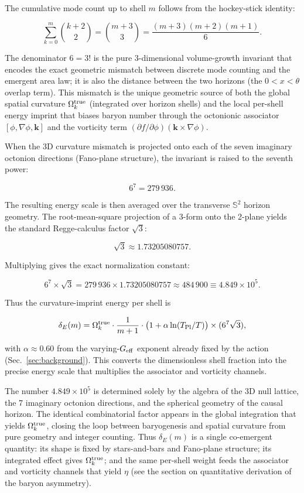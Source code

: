 \documentclass[12pt,a4paper]{article}
\begin{document}
The cumulative mode count up to shell \(m\) follows from the hockey-stick identity:

\[
\sum_{k=0}^m \binom{k+2}{2} = \binom{m+3}{3} = \frac{(m+3)(m+2)(m+1)}{6}.
\]

The denominator \(6=3!\) is the pure 3-dimensional volume-growth invariant that encodes the exact geometric mismatch between discrete mode counting and the emergent area law; it is also the distance between the two horizons (the \(0 < x < \theta\) overlap term). This mismatch is the unique geometric source of both the global spatial curvature \(\Omega_k^{\rm true}\) (integrated over horizon shells) and the local per-shell energy imprint that biases baryon number through the octonionic associator \([\phi,\nabla\phi,\mathbf{k}]\) and the vorticity term \((\partial f/\partial\phi)(\mathbf{k}\times\nabla\phi)\).

When the 3D curvature mismatch is projected onto each of the seven imaginary octonion directions (Fano-plane structure), the invariant is raised to the seventh power:

\[
6^7 = 279\,936.
\]

The resulting energy scale is then averaged over the transverse \(\mathbb{S}^2\) horizon geometry. The root-mean-square projection of a 3-form onto the 2-plane yields the standard Regge-calculus factor \(\sqrt{3}\):

\[
\sqrt{3} \approx 1.73205080757.
\]

Multiplying gives the exact normalization constant:

\[
6^7 \times \sqrt{3} = 279\,936 \times 1.73205080757 \approx 484\,900 \equiv 4.849 \times 10^5.
\]

Thus the curvature-imprint energy per shell is

\[
\delta_E(m) = \Omega_k^{\rm true} \cdot \frac{1}{m+1} \cdot \bigl(1 + \alpha \ln(T_{\rm Pl}/T)\bigr) \times (6^7 \sqrt{3}),
\]

with \(\alpha\approx 0.60\) from the varying-\(G_{\rm eff}\) exponent already fixed by the action (Sec.~\ref{sec:background}). This converts the dimensionless shell fraction into the precise energy scale that multiplies the associator and vorticity channels.

The number \(4.849\times10^5\) is determined solely by the algebra of the 3D null lattice, the 7 imaginary octonion directions, and the spherical geometry of the causal horizon. The identical combinatorial factor appears in the global integration that yields \(\Omega_k^{\rm true}\), closing the loop between baryogenesis and spatial curvature from pure geometry and integer counting. Thus \(\delta_E(m)\) is a single co-emergent quantity: its shape is fixed by stars-and-bars and Fano-plane structure; its integrated effect gives \(\Omega_k^{\rm true}\); and the same per-shell weight feeds the associator and vorticity channels that yield \(\eta\) (see the section on quantitative derivation of the baryon asymmetry).
\end{document}
